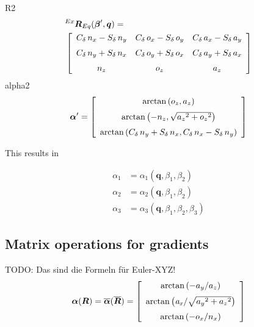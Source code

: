 \documentclass[twocolumn,10pt]{IFTOMM}
\newcommand{\bm}[1]{\boldsymbol{#1}}
\newcommand{\rotmat}[2]{{{ }^{#1}\boldsymbol{R}}_{#2}}
\begin{document}
R2
\begin{align}
&\rotmat{Ex}{Eq}(\bm{\beta}',\bm{q})
= \\
&\left[ \begin {array}{ccc} { C_{\delta}}\,{n_x}-{ S_{\delta}}\,{ n_y}&{ C_{\delta}}\,{o_x}-{ S_{\delta}}\,{o_y}&{ C_{\delta}}\,{ a_x}-{ S_{\delta}}\,{a_y}\\ \noalign{\medskip}{ C_{\delta}}\,{n_y}+ { S_{\delta}}\,{n_x}&{ C_{\delta}}\,{o_y}+{ S_{\delta}}\,{o_x}&{  C_{\delta}}\,{a_y}+{ S_{\delta}}\,{a_x}\\ \noalign{\medskip}{ n_z}&{o_z}&{a_z}\end {array} \right] \nonumber
\end{align}
alpha2
\begin{equation}
\bm{\alpha}' =
 \left[ \begin {array}{c} \arctan \left( {o_z},{a_z} \right)  \\
  \noalign{\medskip}\arctan \left( -{n_z},\sqrt {{{a_z}}^{2}+{{ o_z}}^{2}} \right) \\
  \noalign{\medskip}\arctan \left( {  C_{\delta}}\,{n_y}+{ S_{\delta}}\,{n_x},{ C_{\delta}}\,{n_x}-{  S_{\delta}}\,{n_y} \right) \end {array} \right] 
\end{equation}

This results in

\begin{align}
\alpha_1&=\alpha_1(\bm{q},\beta_1,\beta_2) \\
\alpha_2&=\alpha_2(\bm{q},\beta_1,\beta_2) \\
\alpha_3&=\alpha_3(\bm{q},\beta_1,\beta_2,\beta_3)
\end{align}


\subsection{Matrix operations for gradients}

TODO: Das sind die Formeln für Euler-XYZ!
\begin{equation}
\bm{\alpha}(\bm{R})
=
\overline{\bm{\alpha}}(\overline{\bm{R}})
=
\left[ \begin {array}{c} \arctan \left( -{a_y}/{a_z}
\right) \\ \noalign{\medskip}\arctan \left( {\it a_x}/\sqrt {{{ 
            a_y}}^{2}+{{ a_z}}^{2}} \right) \\ \noalign{\medskip}\arctan
\left( -{ o_x}/{ n_x} \right) \end {array} \right] 
\end{equation}
\end{document}
